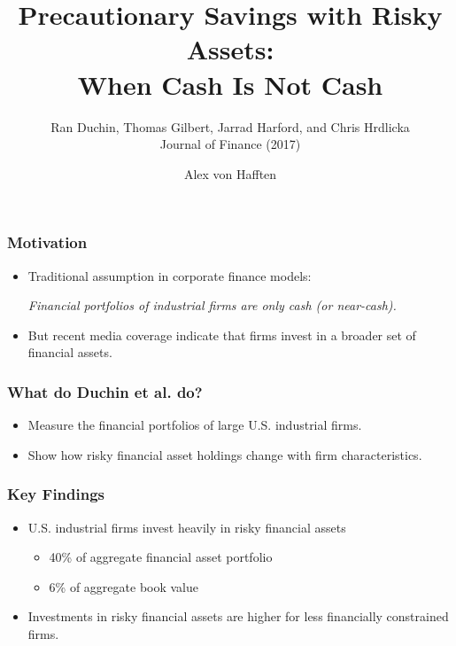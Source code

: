 \documentclass[handout]{beamer}
\title[Precautionary Savings with Risky Assets]{Precautionary Savings with Risky Assets: \\ When Cash Is Not Cash}
\subtitle{Ran Duchin, Thomas Gilbert, Jarrad Harford, and Chris Hrdlicka \\ Journal of Finance (2017)}
\author{Alex von Hafften}
\institute{UW-Madison}
\begin{document}
\begin{frame}
\titlepage
\end{frame}






\begin{frame}
\frametitle{Motivation}
\begin{itemize}[<+->]
\item Traditional assumption in corporate finance models:

\bigskip

\textit{Financial portfolios of industrial firms are only cash (or near-cash).}

\bigskip

\item But recent media coverage indicate that firms invest in a broader set of financial assets.
\end{itemize}
\end{frame}

\begin{frame}
\frametitle{What do Duchin et al. do?}
\begin{itemize}[<+->]
\item Measure the financial portfolios of large U.S. industrial firms.
\bigskip
\item Show how risky financial asset holdings change with firm characteristics.
\end{itemize}
\end{frame}

\begin{frame}
\frametitle{Key Findings}
\begin{itemize}[<+->]
\item U.S. industrial firms invest heavily in risky financial assets
\begin{itemize}[<+->]
\item 40\% of aggregate financial asset portfolio
\item 6\% of aggregate book value
\end{itemize}
\bigskip
\item Investments in risky financial assets are higher for less financially constrained firms.
\end{itemize}
\end{frame}

\end{document}
